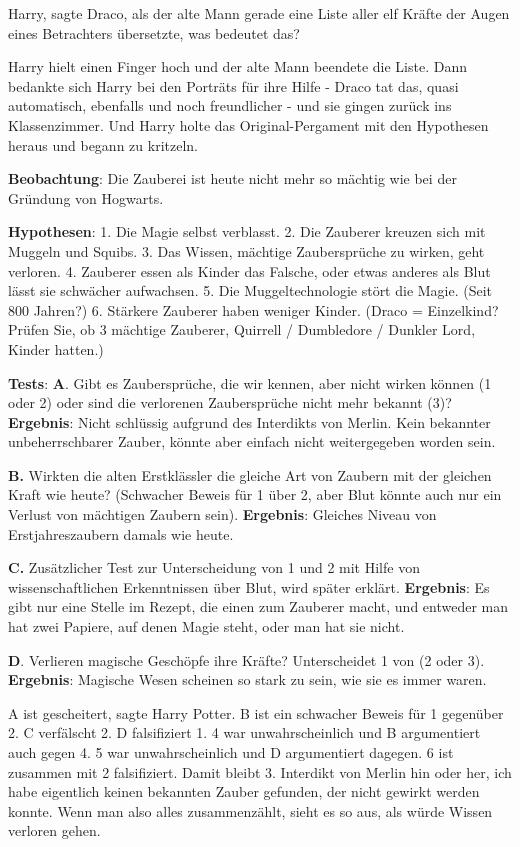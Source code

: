 \glqq Harry\grqq{}, sagte Draco, als der alte Mann gerade eine Liste aller elf
Kräfte der Augen eines Betrachters übersetzte, \glqq was bedeutet das?\grqq{}

Harry hielt einen Finger hoch und der alte Mann beendete die Liste. Dann
bedankte sich Harry bei den Porträts für ihre Hilfe - Draco tat das, quasi
automatisch, ebenfalls und noch freundlicher - und sie gingen zurück ins
Klassenzimmer. Und Harry holte das Original-Pergament mit den Hypothesen heraus
und begann zu kritzeln.

\textbf{Beobachtung}: Die Zauberei ist heute nicht mehr so mächtig wie bei der
Gründung von Hogwarts.

\textbf{Hypothesen}: 1. Die Magie selbst verblasst. 2. Die Zauberer kreuzen sich
mit Muggeln und Squibs. 3. Das Wissen, mächtige Zaubersprüche zu wirken, geht
verloren. 4. Zauberer essen als Kinder das Falsche, oder etwas anderes als Blut
lässt sie schwächer aufwachsen. 5. Die Muggeltechnologie stört die Magie. (Seit
800 Jahren?) 6. Stärkere Zauberer haben weniger Kinder. (Draco = Einzelkind?
Prüfen Sie, ob 3 mächtige Zauberer, Quirrell / Dumbledore / Dunkler Lord, Kinder
hatten.)

\textbf{Tests}: \textbf{A}. Gibt es Zaubersprüche, die wir kennen, aber nicht
wirken können (1 oder 2) oder sind die verlorenen Zaubersprüche nicht mehr
bekannt (3)? \textbf{Ergebnis}: Nicht schlüssig aufgrund des Interdikts von
Merlin. Kein bekannter unbeherrschbarer Zauber, könnte aber einfach nicht
weitergegeben worden sein.

\textbf{B. }Wirkten die alten Erstklässler die gleiche Art von Zaubern mit der
gleichen Kraft wie heute? (Schwacher Beweis für 1 über 2, aber Blut könnte auch
nur ein Verlust von mächtigen Zaubern sein). \textbf{Ergebnis}: Gleiches Niveau
von Erstjahreszaubern damals wie heute.

\textbf{C.} Zusätzlicher Test zur Unterscheidung von 1 und 2 mit Hilfe von
wissenschaftlichen Erkenntnissen über Blut, wird später erklärt.
\textbf{Ergebnis}: Es gibt nur eine Stelle im Rezept, die einen zum Zauberer
macht, und entweder man hat zwei Papiere, auf denen \glqq Magie\grqq{} steht,
oder man hat sie nicht.

\textbf{ D}. Verlieren magische Geschöpfe ihre Kräfte? Unterscheidet 1 von (2
oder 3). \textbf{Ergebnis}: Magische Wesen scheinen so stark zu sein, wie sie es
immer waren.

\glqq A ist gescheitert\grqq{}, sagte Harry Potter. \glqq B ist ein schwacher
Beweis für 1 gegenüber 2. C verfälscht 2. D falsifiziert 1. 4 war
unwahrscheinlich und B argumentiert auch gegen 4. 5 war unwahrscheinlich und D
argumentiert dagegen. 6 ist zusammen mit 2 falsifiziert. Damit bleibt 3.
Interdikt von Merlin hin oder her, ich habe eigentlich keinen bekannten Zauber
gefunden, der nicht gewirkt werden konnte. Wenn man also alles zusammenzählt,
sieht es so aus, als würde Wissen verloren gehen.\grqq{}

